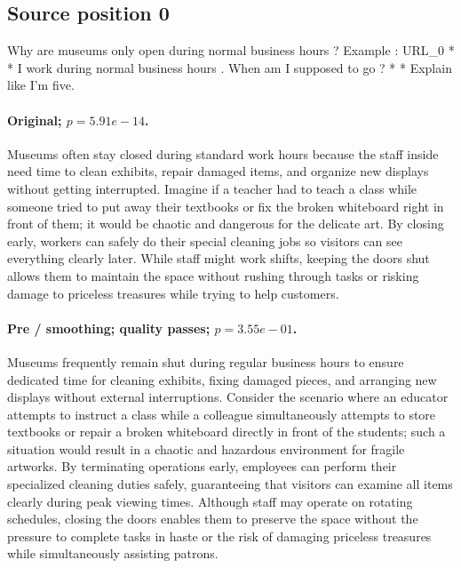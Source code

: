 \subsection*{Source position 0}
Why are museums only open during normal business hours ? Example : URL\_0 * * I work during normal business hours . When am I supposed to go ? * * Explain like I'm five.

\paragraph{Original; $p=5.91e-14$.} Museums often stay closed during standard work hours because the staff inside need time to clean exhibits, repair damaged items, and organize new displays without getting interrupted. Imagine if a teacher had to teach a class while someone tried to put away their textbooks or fix the broken whiteboard right in front of them; it would be chaotic and dangerous for the delicate art. By closing early, workers can safely do their special cleaning jobs so visitors can see everything clearly later. While staff might work shifts, keeping the doors shut allows them to maintain the space without rushing through tasks or risking damage to priceless treasures while trying to help customers.


\paragraph{Pre / smoothing; quality passes; $p=3.55e-01$.} Museums frequently remain shut during regular business hours to ensure dedicated time for cleaning exhibits, fixing damaged pieces, and arranging new displays without external interruptions. Consider the scenario where an educator attempts to instruct a class while a colleague simultaneously attempts to store textbooks or repair a broken whiteboard directly in front of the students; such a situation would result in a chaotic and hazardous environment for fragile artworks. By terminating operations early, employees can perform their specialized cleaning duties safely, guaranteeing that visitors can examine all items clearly during peak viewing times. Although staff may operate on rotating schedules, closing the doors enables them to preserve the space without the pressure to complete tasks in haste or the risk of damaging priceless treasures while simultaneously assisting patrons.

